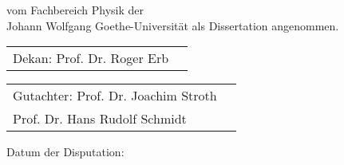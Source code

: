 \thispagestyle{empty}
\vspace*{0.5\textheight}

\noindent{}%
vom Fachbereich Physik der \\[2pt]
Johann Wolfgang Goethe-Universit\"at als Dissertation angenommen.

\vspace*{2cm}

\noindent{}%
\begin{tabular}{@{}l@{\hskip 1ex}l}
  Dekan: \hspace{2.48cm} Prof. Dr. Roger Erb
\end{tabular}

\vspace*{1cm}

\noindent{}%
\begin{tabular}{@{}l@{\hskip 1ex}l}
  Gutachter: \hspace{2cm}Prof. Dr. Joachim Stroth \\
  \hspace{3.84cm} Prof. Dr. Hans Rudolf Schmidt
\end{tabular}

\vspace*{2cm}
\noindent{}%
Datum der Disputation:

